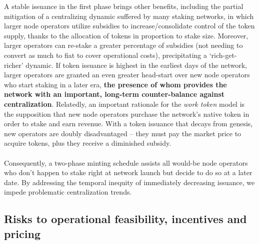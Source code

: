 \documentclass[8pt]{article}
\begin{document}
A stable issuance in the first phase brings other benefits, including the partial mitigation of a centralizing dynamic suffered by many staking networks, in which larger node operators utilize subsidies to increase/consolidate control of the token supply, thanks to the allocation of tokens in proportion to stake size. Moreover, larger operators can re-stake a greater percentage of subsidies (not needing to convert as much to fiat to cover operational costs), precipitating a `rich-get-richer' dynamic. If token issuance is highest in the earliest days of the network, larger operators are granted an even greater head-start over new node operators who start staking in a later era, \textbf{the presence of whom provides the network with an important, long-term counter-balance against centralization}. Relatedly, an important rationale for the \textit{work token} model is the supposition that new node operators purchase the network's native token in order to stake and earn revenue. With a token issuance that decays from genesis, new operators are doubly disadvantaged – they must pay the market price to acquire tokens, plus they receive a diminished subsidy. 
\\\\
Consequently, a two-phase minting schedule assists all would-be node operators who don't happen to stake right at network launch but decide to do so at a later date. By addressing the temporal inequity of immediately decreasing issuance, we impede problematic centralization trends.

\subsection{Risks to operational feasibility, incentives and pricing}
\end{document}
